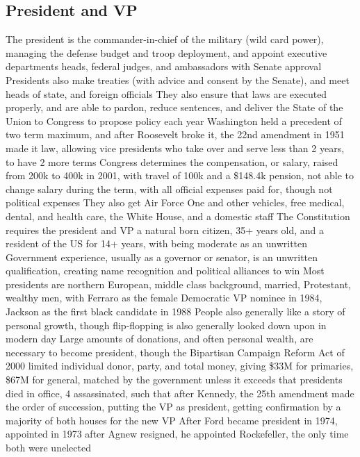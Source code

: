 \documentclass[11 pt, twoside]{article}
\newenvironment{outline*}
{
	\begin{outline}[enumerate]
	}
	{\end{outline}
}
\begin{document}
\subsection{President and VP}
\begin{outline*}
\1 The president is the commander-in-chief of the military (wild card power), managing the defense budget and troop deployment, and appoint executive departments heads, federal judges, and ambassadors with Senate approval
\2 Presidents also make treaties (with advice and consent by the Senate), and meet heads of state, and foreign officials
\2 They also ensure that laws are executed properly, and are able to pardon, reduce sentences, and deliver the State of the Union to Congress to propose policy each year
\1 Washington held a precedent of two term maximum, and after Roosevelt broke it, the 22nd amendment in 1951 made it law, allowing vice presidents who take over and serve less than 2 years, to have 2 more terms
\1 Congress determines the compensation, or salary, raised from 200k to 400k in 2001, with travel of 100k and a \$148.4k pension, not able to change salary during the term, with all official expenses paid for, though not political expenses
\2 They also get Air Force One and other vehicles, free medical, dental, and health care, the White House, and a domestic staff
\1 The Constitution requires the president and VP a natural born citizen, 35+ years old, and a resident of the US for 14+ years, with being moderate as an unwritten
\2 Government experience, usually as a governor or senator, is an unwritten qualification, creating name recognition and political alliances to win
\2 Most presidents are northern European, middle class background, married, Protestant, wealthy men, with Ferraro as the female Democratic VP nominee in 1984, Jackson as the first black candidate in 1988
\2 People also generally like a story of personal growth, though flip-flopping is also generally looked down upon in modern day
\2 Large amounts of donations, and often personal wealth, are necessary to become president, though the Bipartisan Campaign Reform Act of 2000 limited individual donor, party, and total money, giving \$33M for primaries, \$67M for general, matched by the government unless it exceeds that
 presidents died in office, 4 assassinated, such that after Kennedy, the 25th amendment made the order of succession, putting the VP as president, getting confirmation by a majority of both houses for the new VP
\2 After Ford became president in 1974, appointed in 1973 after Agnew resigned, he appointed Rockefeller, the only time both were unelected

\end{outline*}
\end{document}

